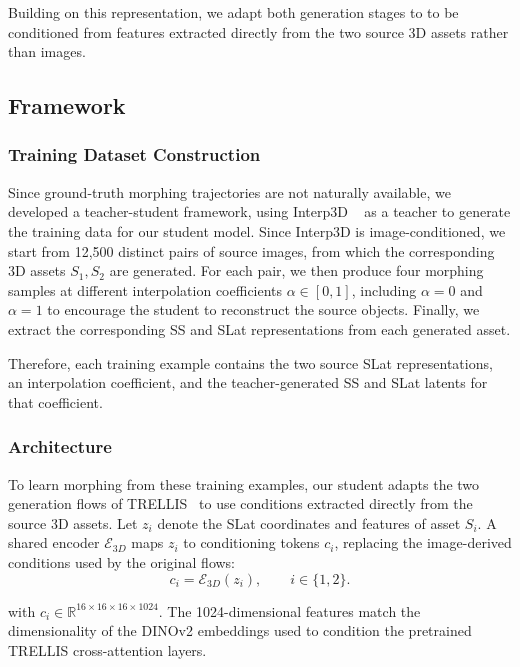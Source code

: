 Building on this representation, we adapt both generation stages to to be conditioned from features extracted directly from the two source 3D assets rather than images.

\subsection{Framework}
\subsubsection{Training Dataset Construction}
\label{sec:dataset_construction}
Since ground-truth morphing trajectories are not naturally available, we developed a teacher-student framework, using Interp3D ~\cite{liu2026interp3d} as a teacher to generate the training data for our student model. Since Interp3D is image-conditioned, we start from 12,500 distinct pairs of source images, from which the corresponding 3D assets $S_1,S_2$ are generated. For each pair, we then produce four morphing samples at different interpolation coefficients $\alpha\in[0,1]$, including $\alpha=0$ and $\alpha=1$ to encourage the student to reconstruct the source objects. Finally, we extract the corresponding SS and SLat representations from each generated asset. 

Therefore, each training example contains the two source SLat representations, an interpolation coefficient, and the teacher-generated SS and SLat latents for that coefficient.

\subsubsection{Architecture}
\label{sec:architecture}
To learn morphing from these training examples, our student adapts the two generation flows of TRELLIS~\cite{xiang2025trellis} to use conditions extracted directly from the source 3D assets. Let $z_i$ denote the SLat coordinates and features of asset $S_i$. A shared encoder $\mathcal E_{3D}$ maps $z_i$ to conditioning tokens $c_i$, replacing the image-derived conditions used by the original flows:
\begin{equation}
c_i = \mathcal E_{3D}(z_i),
\qquad i\in\{1,2\}.
\label{eq:source_conditioning}
\end{equation}

\noindent with $c_i\in\mathbb{R}^{16\times16\times16\times 1024}$. The 1024-dimensional features match the dimensionality of the DINOv2 embeddings used to condition the pretrained TRELLIS cross-attention layers.

